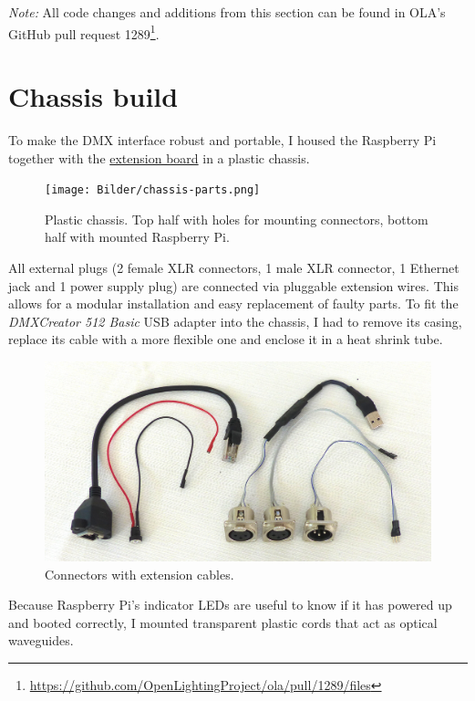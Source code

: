 \emph{Note:} All code changes and additions from this section can be
found in OLA's GitHub pull request 1289\footnote{\url{https://github.com/OpenLightingProject/ola/pull/1289/files}}.

\section{Chassis build}\label{sec:chassis}

To make the DMX interface robust and portable, I housed the Raspberry Pi
together with the \protect\hyperlink{sec:extension-board}{extension
board} in a plastic chassis.

\begin{figure}
\centering
\texttt{[image: Bilder/chassis-parts.png]}
\caption[Plastic chassis]{Plastic chassis. Top half with holes for mounting connectors,
bottom half with mounted Raspberry Pi.}
\end{figure}

All external plugs (2 female XLR connectors, 1 male XLR connector, 1
Ethernet jack and 1 power supply plug) are connected via pluggable
extension wires. This allows for a modular installation and easy
replacement of faulty parts. To fit the \emph{DMXCreator 512 Basic} USB
adapter into the chassis, I had to remove its casing, replace its cable
with a more flexible one and enclose it in a heat shrink tube.

\begin{figure}
\centering
\includegraphics[width=1.00000\textwidth]{Bilder/chassis-cables.jpg}
\caption[Connectors with extension cables]{Connectors with extension cables.}
\end{figure}

Because Raspberry Pi's indicator LEDs are useful to know if it has
powered up and booted correctly, I mounted transparent plastic cords
that act as optical waveguides.

